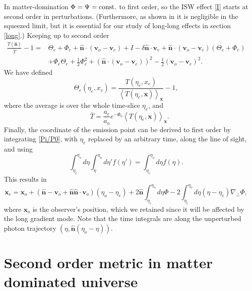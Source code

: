 \documentclass[12pt]{article}
\numberwithin{equation}{section}
\def\bsb{\boldsymbol}
\def\be{\begin{equation}}
\def\ee{\end{equation}}
\def\n{\bsb{\hat n}}
\def\x{{\bsb x}}
\newcommand{\expect}[1]{\left\langle #1 \right\rangle}
\begin{document}
{In matter-domination $\Phi=\Psi = \rm{const.}$ to first order, so the ISW effect \eqref{I} starts at second order in perturbations. (Furthermore, as shown in \cite{Creminelli_SW} it is negligible in the squeezed limit, but it is essential for our study of long-long effects in section \ref{long}.) Keeping up to second order
\be
\begin{split}
\frac{T(\bsb{\hat n})}{\bar T} -1
=&\Theta_e +\Phi_e+\bsb{\hat n}\cdot (\bsb v_o-\bsb v_e)+I-{\delta \n}\cdot \bsb v_e +
\bsb{\hat n} \cdot (\bsb v_o-\bsb v_e)(\Theta_e+\Phi_e)\\
&+\Phi_e\Theta_e +\frac{1}{2}\Phi_e^2
+(\bsb{\hat n} \cdot (\bsb v_o-\bsb v_e))^2-\frac{1}{2}(\bsb v_o-\bsb v_e)^2.
\end{split}
\ee
We have defined 
\be
\Theta_e (\eta_e,x_e)= \frac{T(\eta_e,x_e)}{\expect{T(\eta_e,\x)}_\x}-1,
\ee
where the average is over the whole time-slice $\eta_e$, and 
\be
 \quad \bar T = \frac{a_e}{a_o}e^{-\Phi_o} \expect{T(\eta_e,\x)}_\x.
\ee
Finally, the coordinate of the emission point can be derived to first order by integrating \eqref{Pi/P0}, with $\eta_e$ replaced by an arbitrary time, along the line of sight, and using
\be
\int_{\eta_e}^{\eta_o}d\eta \int_{\eta}^{\eta_o} d\eta' f(\eta') = \int_{\eta_e}^{\eta_o} d\eta f(\eta).
\ee
This results in
\be
\bsb x_e = \bsb x_o + (\bsb{\hat n} -\bsb v_o + \bsb{\hat n} \bsb{\hat n}\cdot \bsb v_o)(\eta_o -\eta_e) + 2\bsb{\hat n} \int_{\eta_e}^{\eta_o} d\eta \Phi 
- 2\int_{\eta_e}^{\eta_o} d\eta (\eta-\eta_e) \nabla_\perp \Phi,
\ee
where $\bsb x_o$ is the observer's position, which we retained since it will be affected by the long gradient mode. Note that the time integrals are along the unperturbed photon trajectory $(\eta, \n(\eta_o-\eta))$.

\newpage
\section{Second order metric in matter dominated universe\label{second}}

}
\end{document}
